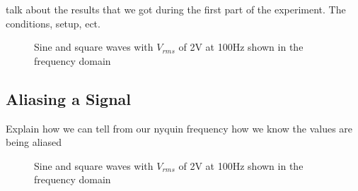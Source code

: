\documentclass[letterpaper,12pt]{article}
\begin{document}
talk about the results that we got during the first part of the experiment. The conditions, setup, ect.
\begin{figure}[hbt!]
\centering
{}
\quad
{}
\caption{Sine and square waves with $V_{rms}$ of 2V at 100Hz shown in the frequency domain}
\end{figure}

\subsection{Aliasing a Signal}
Explain how we can tell from our nyquin frequency how we know the values are being aliased


\begin{figure}[h!]
\centering
{}
\quad
{}
\caption{Sine and square waves with $V_{rms}$ of 2V at 100Hz shown in the frequency domain}
\end{figure}
\end{document}
